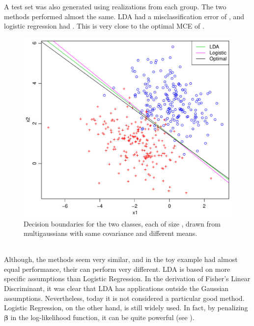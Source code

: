 A test set was also generated using  realizations from each group. The two methods performed almost the same. LDA had a misclassification error of , and logistic regression had . This is very close to the optimal MCE of .
\\
%
\begin{figure}[h!]
\begin{center}
    \includegraphics[scale=0.5]{./figures/ldaVsLogistic.pdf}
\end{center}
\caption{Decision boundaries for the two classes, each of size , drawn from multigaussians with same covariance and different means.}
\label{fig:ldaVsLogistic}
\end{figure}
\\
Although, the methods seem very similar, and in the toy example had almost equal performance, their can perform very different. LDA is based on more specific assumptions than Logistic Regression. In the derivation of Fisher's Linear Discriminant, it was clear that LDA has applications outside the Gaussian assumptions. Nevertheless, today it is not considered a particular good method. Logistic Regression, on the other hand, is still widely used.  In fact, by penalizing $\bm \beta$ in the log-likelihood function, it can be quite powerful (see \cite{modstat}).
